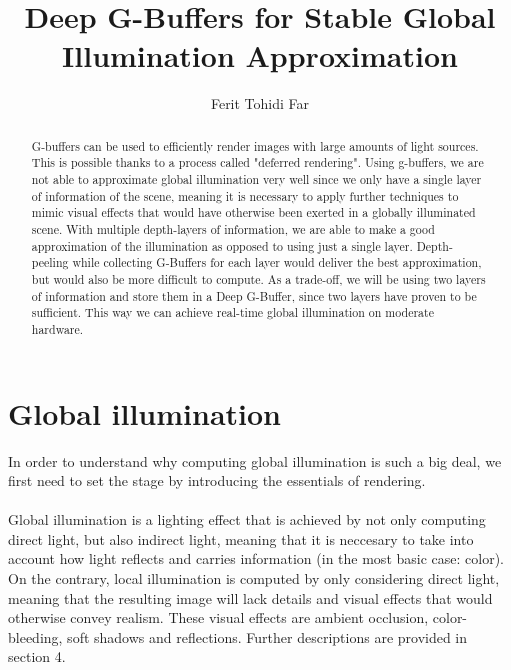 \documentclass{ACGSeminar}
\begin{document}
\title{Deep G-Buffers for Stable Global Illumination Approximation}

\author{Ferit Tohidi Far}

\maketitle


\begin{abstract}%
G-buffers can be used to efficiently render images with large amounts of light sources. This is possible thanks to a process called "deferred rendering". Using g-buffers, we are not able to approximate global illumination very well since we only have a single layer of information of the scene, meaning it is necessary to apply further techniques to mimic visual effects that would have otherwise been exerted in a globally illuminated scene. With multiple depth-layers of information, we are able to make a good approximation of the illumination as opposed to using just a single layer. Depth-peeling while collecting G-Buffers for each layer would deliver the best approximation, but would also be more difficult to compute. As a trade-off, we will be using two layers of information and store them in a Deep G-Buffer, since two layers have proven to be sufficient. This way we can achieve real-time global illumination on moderate hardware.
\end{abstract}

\tableofcontents
\listoffigures
\listofalgorithms

\label{cha:references}

\newpage

\label{cha:introduction}
\section{Global illumination}
	In order to understand why computing global illumination is such a big deal, we first need to set the stage by introducing the essentials of rendering. \\\\
	Global illumination is a lighting effect that is achieved by not only computing direct light, but also indirect light, meaning that it is neccesary to take	into account how light reflects and carries information (in the most basic case: color). On the contrary, local illumination is computed by only considering direct light, meaning that the resulting image will lack details and visual effects that would otherwise convey realism. These visual effects are ambient occlusion, color-bleeding, soft shadows and reflections. Further descriptions are provided in section 4.
\end{document}
